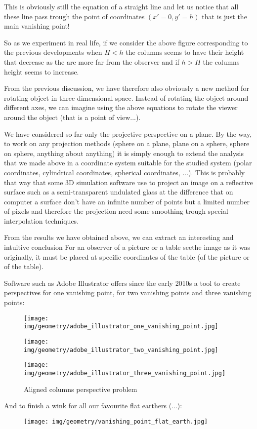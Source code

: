 	This is obviously still the equation of a straight line and let us notice that all these line pass trough the point of coordinates $(x'=0,y'=h)$ that is just the main vanishing point!
	
	So as we experiment in real life, if we consider the above figure corresponding to the previous developments when $H<h$ the columns seems to have their height that decrease as the are more far from the observer and if $h>H$ the columns height seems to increase.
	
	From the previous discussion, we have therefore also obviously a new method for rotating object in three dimensional space. Instead of rotating the object around different axes, we can imagine using the above equations to rotate the viewer around the object (that is a point of view...).

	We have considered so far only the projective perspective on a plane. By the way, to work on any projection methods (sphere on a plane, plane on a sphere, sphere on sphere, anything about anything) it is simply enough to extend the analysis that we made above in a coordinate system suitable for the studied system (polar coordinates, cylindrical coordinates, spherical coordinates, ...). This is probably that way that some 3D simulation software use to project an image on a reflective surface such as a semi-transparent undulated glass at the difference that on computer a surface don't have an infinite number of points but a limited number of pixels and therefore the projection need some smoothing trough special interpolation techniques.
	
	\begin{tcolorbox}[title=Remark,colframe=black,arc=10pt]
	From the results we have obtained above, we can extract an interesting and intuitive conclusion For an observer of a picture or a table seethe image as it was originally, it must be placed at specific coordinates of the table (of the picture or of the table).
	\end{tcolorbox}
	Software such as Adobe Illustrator offers since the early 2010s a tool to create perspectives for one vanishing point, for two vanishing points and three vanishing points:
	\begin{figure}[H]
		\centering
		\texttt{[image: img/geometry/adobe\_illustrator\_one\_vanishing\_point.jpg]}
	\end{figure}
	\begin{figure}[H]
		\centering
		\texttt{[image: img/geometry/adobe\_illustrator\_two\_vanishing\_point.jpg]}
	\end{figure}
	\begin{figure}[H]
		\centering
		\texttt{[image: img/geometry/adobe\_illustrator\_three\_vanishing\_point.jpg]}
		\caption{Aligned columns perspective problem}
	\end{figure}
	And to finish a wink for all our favourite flat earthers (...):
	\begin{figure}[H]
		\centering
		\texttt{[image: img/geometry/vanishing\_point\_flat\_earth.jpg]}
	\end{figure}
	

